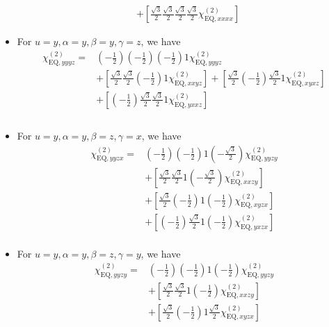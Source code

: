 \documentclass[UTF8,10pt,a4paper]{article}
\begin{document}
\begin{itemize}
\begin{align}
&+\left[\frac{\sqrt{3}}{2}\frac{\sqrt{3}}{2}\frac{\sqrt{3}}{2}\frac{\sqrt{3}}{2}\chi_{\text{EQ},xxxx}^{(2)}\right]
\end{align}\normalsize
\item For $u=y,\alpha=y,\beta=y,\gamma=z$, we have
\footnotesize\begin{align}
\nonumber\chi_{\text{EQ},yyyz}^{(2)}=&\left(-\frac{1}{2}\right)\left(-\frac{1}{2}\right)\left(-\frac{1}{2}\right)1\chi_{\text{EQ},yyyz}^{(2)}\\
\nonumber&+\left[\frac{\sqrt{3}}{2}\frac{\sqrt{3}}{2}\left(-\frac{1}{2}\right)1\chi_{\text{EQ},xxyz}^{(2)}\right]+\left[\frac{\sqrt{3}}{2}\left(-\frac{1}{2}\right)\frac{\sqrt{3}}{2}1\chi_{\text{EQ},xyxz}^{(2)}\right]\\
\nonumber&+\left[\left(-\frac{1}{2}\right)\frac{\sqrt{3}}{2}\frac{\sqrt{3}}{2}1\chi_{\text{EQ},yxxz}^{(2)}\right]\\
\nonumber&\\
&
\end{align}\normalsize
\item For $u=y,\alpha=y,\beta=z,\gamma=x$, we have
\footnotesize\begin{align}
\nonumber\chi_{\text{EQ},yyzx}^{(2)}=&\left(-\frac{1}{2}\right)\left(-\frac{1}{2}\right)1\left(-\frac{\sqrt{3}}{2}\right)\chi_{\text{EQ},yyzy}^{(2)}\\
\nonumber&+\left[\frac{\sqrt{3}}{2}\frac{\sqrt{3}}{2}1\left(-\frac{\sqrt{3}}{2}\right)\chi_{\text{EQ},xxzy}^{(2)}\right]\\
\nonumber&+\left[\frac{\sqrt{3}}{2}\left(-\frac{1}{2}\right)1\left(-\frac{1}{2}\right)\chi_{\text{EQ},xyzx}^{(2)}\right]\\
\nonumber&+\left[\left(-\frac{1}{2}\right)\frac{\sqrt{3}}{2}1\left(-\frac{1}{2}\right)\chi_{\text{EQ},yxzx}^{(2)}\right]\\
&
\end{align}\normalsize
\item For $u=y,\alpha=y,\beta=z,\gamma=y$, we have
\footnotesize\begin{align}
\nonumber\chi_{\text{EQ},yyzy}^{(2)}=&\left(-\frac{1}{2}\right)\left(-\frac{1}{2}\right)1\left(-\frac{1}{2}\right)\chi_{\text{EQ},yyzy}^{(2)}\\
\nonumber&+\left[\frac{\sqrt{3}}{2}\frac{\sqrt{3}}{2}1\left(-\frac{1}{2}\right)\chi_{\text{EQ},xxzy}^{(2)}\right]\\
\nonumber&+\left[\frac{\sqrt{3}}{2}\left(-\frac{1}{2}\right)1\frac{\sqrt{3}}{2}\chi_{\text{EQ},xyzx}^{(2)}\right]\\

\end{align}
\end{itemize}
\end{document}
